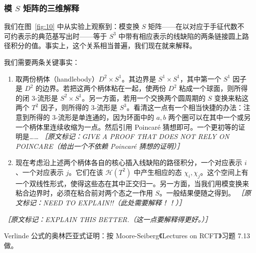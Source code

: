 \subsubsection*{模 $S$ 矩阵的三维解释}

我们在图~\ref{fig:10} 中从实验上观察到：模变换 $S$ 矩阵——在以对应于手征代数不可约表示的典范基写出时——等于 $S^3$ 中带有相应表示的线缺陷的两条链接圆上路径积分的值。事实上，这个关系相当普遍，我们现在就来解释。

我们需要两条关键事实：

\begin{enumerate}
  \item 取两份柄体（handlebody）$D^2\times S^1$。其边界是 $S^1\times S^1$，其中第一个 $S^1$ 因子是 $D^2$ 的边界。若把这两个柄体粘在一起，使两份 $D^2$ 粘成一个球面，则所得的闭 $3$-流形是 $S^2\times S^1$。另一方面，若用一个交换两个圆周期的 $S$ 变换来粘这两个 $T^2$ 因子，则所得的 $3$-流形是 $S^3$。看清这一点有一个相当快捷的办法：注意到所得的 $3$-流形是单连通的，因为环面中的 $a,b$ 两个圈可以在其中一个或另一个柄体里连续收缩为一点。然后引用 Poincaré 猜想即可。一个更初等的证明是……
  {\small\itshape ［原文标记：GIVE A PROOF THAT DOES NOT RELY ON POINCARE（给出一个不依赖 Poincaré 猜想的证明）］}

  \item 现在考虑沿上述两个柄体各自的核心插入线缺陷的路径积分，一个对应表示 $i$、一个对应表示 $j$。它们在该 $\mathcal{H}(T^2)$ 中产生相应的态 $\chi_i,\chi_j$。这个空间上有一个双线性形式，使得这些态在其中正交归一。另一方面，当我们用模变换来粘合边界时，必须在粘合前对两个态之一作用 $S$。一般结果便随之得到。
  {\small\itshape ［原文标记：NEED TO EXPLAIN!!（此处需要解释！！）］}
\end{enumerate}

{\small\itshape ［原文标记：EXPLAIN THIS BETTER.（这一点要解释得更好。）］}

Verlinde 公式的奥林匹亚式证明：按 Moore-Seiberg《Lectures on RCFT》习题 7.13 做。

